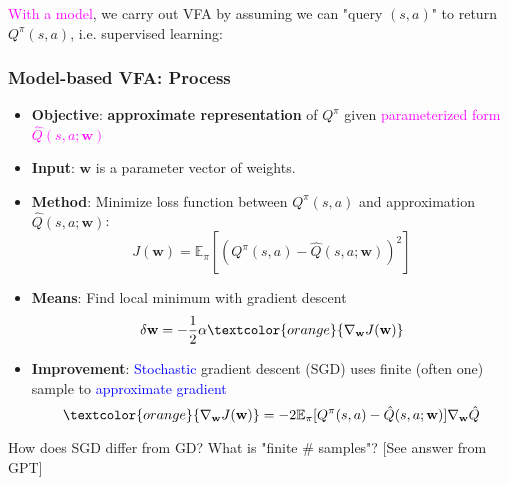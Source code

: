 \documentclass{article}
\begin{document}
\textcolor{magenta}{With a model}, we carry out VFA by assuming we can "query $(s, a)$" to return $Q^{\pi}(s, a)$, i.e. supervised learning:
\begin{defbox}
    \subsubsection*{Model-based VFA: Process}
    \begin{itemize}
    \item \textbf{Objective}: \textbf{approximate representation} of $Q^{\pi}$ given \textcolor{magenta}{parameterized form $\hat{Q}(s, a; \mathbf{w})$}
    \item \textbf{Input}: $\mathbf{w}$ is a parameter vector of weights.
    \item \textbf{Method}: Minimize loss function between $Q^{\pi}(s, a)$ and approximation $\hat{Q}(s, a; \mathbf{w})$:
        \begin{equation*}
            J(\mathbf{w}) = \mathbb{E}_{\pi}[ \left(Q^{\pi} (s, a) - \hat{Q}(s, a; \mathbf{w}) \right)^2]
        \end{equation*}
    \item \textbf{Means}: Find local minimum with gradient descent
        \begin{equation*}
            \delta \mathbf{w} = -\frac{1}{2} \alpha \textcolor{orange}{\nabla_{\mathbf{w}} J(\mathbf{w})}
        \end{equation*}
    \item \textbf{Improvement}: \textcolor{blue}{Stochastic} gradient descent (SGD) uses finite (often one) sample to \textcolor{blue}{approximate gradient}
        \begin{equation*}
            \textcolor{orange}{\nabla_{\mathbf{w}} J(\mathbf{w})} = -2 \mathbb{E}_{\pi}[ Q^{\pi} (s, a) - \hat{Q}(s, a; \mathbf{w})] \nabla_{\mathbf{w}} \hat{Q}
        \end{equation*}
    \end{itemize}
\end{defbox} 

\begin{hintbox}
    How does SGD differ from GD? What is "finite \# samples"?
    [See answer from GPT]
\end{hintbox}
\end{document}
